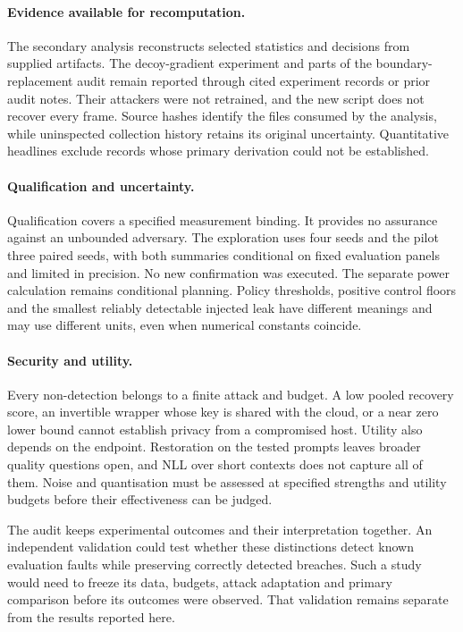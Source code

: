 \paragraph{Evidence available for recomputation.}
The secondary analysis reconstructs selected statistics and decisions
from supplied artifacts. The decoy-gradient experiment and parts of the
boundary-replacement audit remain reported through cited experiment
records or prior audit notes. Their attackers were not retrained, and
the new script does not recover every frame. Source hashes identify the
files consumed by the analysis, while uninspected collection history
retains its original uncertainty. Quantitative headlines exclude records
whose primary derivation could not be established.

\paragraph{Qualification and uncertainty.}
Qualification covers a specified measurement binding. It provides no
assurance against an unbounded adversary. The exploration uses four seeds
and the pilot three paired seeds, with both summaries conditional on fixed
evaluation panels and limited in precision. No new confirmation was
executed. The separate power calculation remains conditional planning.
Policy thresholds, positive control floors and the smallest reliably
detectable injected leak have different meanings and may use different
units, even when numerical constants coincide.

\paragraph{Security and utility.}
Every non-detection belongs to a finite attack and budget. A low pooled
recovery score, an invertible wrapper whose key is shared with the cloud,
or a near zero lower bound cannot establish privacy from a compromised
host. Utility also depends on the endpoint. Restoration on the tested
prompts leaves broader quality questions open, and NLL over short contexts
does not capture all of them. Noise and quantisation must be assessed at
specified strengths and utility budgets before their effectiveness can be
judged.

The audit keeps experimental outcomes and their interpretation together.
An independent validation could test whether these distinctions detect
known evaluation faults while preserving correctly detected breaches.
Such a study would need to freeze its data, budgets, attack adaptation
and primary comparison before its outcomes were observed. That validation
remains separate from the results reported here.

